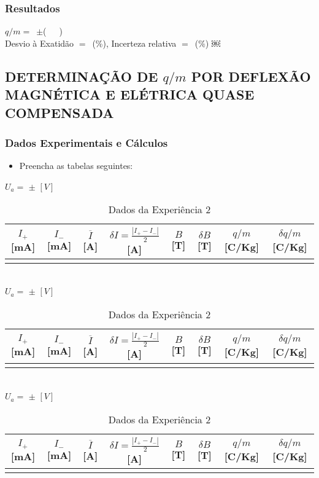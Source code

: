 \documentclass[a4paper,12pt]{article}  %
\begin{document}
\subsubsection{\sf Resultados}
\noindent  $q/m =$~\underline{\makebox[1.5cm][r]{~}}$\pm$\underline{\makebox[1cm][r]{~}}(~~~)\\  

\noindent  Desvio à Exatidão $=$~\underline{\makebox[1cm][r]{~}}(\%), 
Incerteza relativa $=$~\underline{\makebox[1cm][r]{~}}($\%$) 
￼
\subsection{\sf DETERMINAÇÃO DE $q/m$ POR DEFLEXÃO\\ MAGNÉTICA E ELÉTRICA QUASE COMPENSADA }

\subsubsection{\sf Dados Experimentais e Cálculos}

\begin{itemize}
\item Preencha as tabelas seguintes:
\end{itemize}
\begin{table}[!hbp]
	\centering
	\noindent	$U_a =$ \underline{\makebox[1.5cm][r]{~}} $\pm$ \underline{\makebox[1cm][r]{~}} $[V]$ \\
	\begin{tabular}{|c|c|c|c|c|c|c|c|}
	\hline
	 $I_+$ [mA] & $I_-$ [mA] & $\overline{I}$ [A]	& $\delta I = \frac{| I_+ - I_-|}{2}$ [A] & $B$ [T] & $\delta B$  [T] & $q/m$ [C/Kg] & $\delta q/m$ [C/Kg] \\
	\hline
	 &  &  & &  &  & & \\
	 \hline
 	\end{tabular}\\[10pt]
	\noindent	$U_a =$ \underline{\makebox[1.5cm][r]{~}} $\pm$ \underline{\makebox[1cm][r]{~}} $[V]$ \\
	\begin{tabular}{|c|c|c|c|c|c|c|c|}
	\hline
	 $I_+$ [mA] & $I_-$ [mA] & $\overline{I}$ [A]	& $\delta I = \frac{| I_+ - I_-|}{2}$ [A] & $B$ [T] & $\delta B$  [T] & $q/m$ [C/Kg] & $\delta q/m$ [C/Kg] \\
	\hline
	 &  &  & &  &  & & \\
	 \hline
 	\end{tabular}\\[10pt]
	\noindent	$U_a =$ \underline{\makebox[1.5cm][r]{~}} $\pm$ \underline{\makebox[1cm][r]{~}} $[V]$ \\
	\begin{tabular}{|c|c|c|c|c|c|c|c|}
	\hline
	 $I_+$ [mA] & $I_-$ [mA] & $\overline{I}$ [A]	& $\delta I = \frac{| I_+ - I_-|}{2}$ [A] & $B$ [T] & $\delta B$  [T] & $q/m$ [C/Kg] & $\delta q/m$ [C/Kg] \\
	\hline
	 &  &  & &  &  & & \\
	 \hline
 	\end{tabular}
	
	\caption{Dados da Experiência 2} 
	\label{tab:Dados2}
\end{table}
\end{document}
